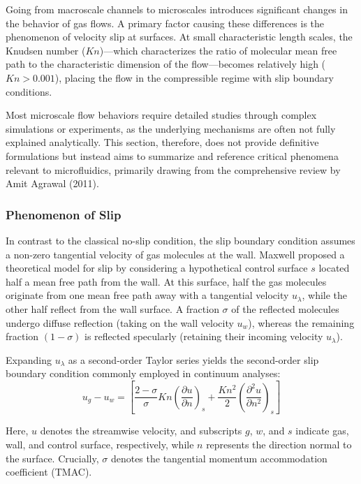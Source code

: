 Going from macroscale channels to microscales introduces significant changes in the behavior of gas flows.
A primary factor causing these differences is the phenomenon of velocity slip at surfaces.
At small characteristic length scales, the Knudsen number ($Kn$)—which characterizes the ratio of molecular mean free path to the characteristic dimension of the flow—becomes relatively high ($Kn > 0.001$), placing the flow in the compressible regime with slip boundary conditions.

Most microscale flow behaviors require detailed studies through complex simulations or experiments, as the underlying mechanisms are often not fully explained analytically.
This section, therefore, does not provide definitive formulations but instead aims to summarize and reference critical phenomena relevant to microfluidics, primarily drawing from the comprehensive review by Amit Agrawal (2011).

\subsubsection*{Phenomenon of Slip}
	In contrast to the classical no-slip condition, the slip boundary condition assumes a non-zero tangential velocity of gas molecules at the wall.
	Maxwell proposed a theoretical model for slip by considering a hypothetical control surface $s$ located half a mean free path from the wall.
	At this surface, half the gas molecules originate from one mean free path away with a tangential velocity $u_\lambda$, while the other half reflect from the wall surface.
	A fraction $\sigma$ of the reflected molecules undergo diffuse reflection (taking on the wall velocity $u_w$), whereas the remaining fraction $(1 - \sigma)$ is reflected specularly (retaining their incoming velocity $u_\lambda$).

	Expanding $u_\lambda$ as a second-order Taylor series yields the second-order slip boundary condition commonly employed in continuum analyses:
	\begin{equation}
		u_g - u_w =
		\left[
			\frac{2-\sigma}{\sigma}Kn\left(\frac{\partial u}{\partial n}\right)_s
			+ \frac{Kn^2}{2} \left(\frac{\partial^2 u}{\partial n^2}\right)_s
		\right]
	\end{equation}

	Here, $u$ denotes the streamwise velocity, and subscripts $g$, $w$, and $s$ indicate gas, wall, and control surface, respectively, while $n$ represents the direction normal to the surface.
	Crucially, $\sigma$ denotes the tangential momentum accommodation coefficient (TMAC).

